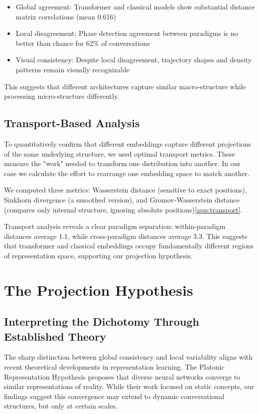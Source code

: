 \documentclass[11pt,letterpaper]{article}
\newcommand{\crossParadigmCorr}{0.616}
\begin{document}
\begin{itemize}
\item Global agreement: Transformer and classical models show substantial distance matrix correlations (mean \crossParadigmCorr{})
\item Local disagreement: Phase detection agreement between paradigms is no better than chance for 62\% of conversations
\item Visual consistency: Despite local disagreement, trajectory shapes and density patterns remain visually recognizable
\end{itemize}

This suggests that different architectures capture similar macro-structure while processing micro-structure differently.

\subsection{Transport-Based Analysis}

To quantitatively confirm that different embeddings capture different projections of the same underlying structure, we used optimal transport metrics. These measure the "work" needed to transform one distribution into another. In our case we calculate the effort to rearrange one embedding space to match another.

We computed three metrics: Wasserstein distance (sensitive to exact positions), Sinkhorn divergence (a smoothed version), and Gromov-Wasserstein distance (compares only internal structure, ignoring absolute positions)\ref{app:transport}.

Transport analysis reveals a clear paradigm separation: within-paradigm distances average 1.1, while cross-paradigm distances average 3.3. This suggests that transformer and classical embeddings occupy fundamentally different regions of representation space, supporting our projection hypothesis.

\section{The Projection Hypothesis}

\subsection{Interpreting the Dichotomy Through Established Theory}

The sharp distinction between global consistency and local variability aligns with recent theoretical developments in representation learning. The Platonic Representation Hypothesis \citep{huh2024platonic} proposes that diverse neural networks converge to similar representations of reality. While their work focused on static concepts, our findings suggest this convergence may extend to dynamic conversational structures, but only at certain scales.
\end{document}

